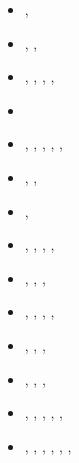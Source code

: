 \begin{small}
\begin{itemize}
\item[\twothousandsix]       \textcite{stfs06},  \textcite{momu06}
\item[\twothousandseven]     \textcite{moql07},  \textcite{stfs07}, 
                             \textcite{qums07}
\item[\twothousandeight]     \textcite{lemm08},  \textcite{ozrs08}, 
                             \textcite{gotc08},  \textcite{stmt08},
                             \textcite{scsf11}
\item[\twothousandnine]      \textcite{stfm09} 
\item[\twothousandten]       \textcite{casm10},  \textcite{mamb10}, 
                             \textcite{stsf10},  \textcite{stfc10},
                             \textcite{fasm10},  \textcite{cazf10}
\item[\twothousandeleven]    \textcite{memm11},  \textcite{cafz11},  \textcite{leha11}
\item[\twothousandtwelve]    \textcite{cafa12},  \textcite{faca12}
\item[\twothousandthirteen]  \textcite{bemm12},  \textcite{scmo13}, 
                             \textcite{faca13},  \textcite{care13}, 
                             \textcite{coml13}
\item[\twothousandfourteen]  \textcite{famc14},  \textcite{shjm14},  \textcite{grbo14},
                             \textcite{comi14}
\item[\twothousandfifteen]   \textcite{quxm15},  \textcite{bemm15}, 
                             \textcite{scsp15},  \textcite{shmj15}, 
                             \textcite{carr15}
\item[\twothousandsixteen]   \textcite{shmv16},  \textcite{onlw16}, 
                             \textcite{kicf16},  \textcite{sacf16}
\item[\twothousandseventeen] \textcite{bems17},  \textcite{kicf17}, 
                             \textcite{sche17},  \textcite{wakc17}
\item[\twothousandeighteen]  \textcite{memm18},  \textcite{yamz18}, 
                             \textcite{bemc18},  \textcite{mord18},
                             \textcite{wakc18},  \textcite{wakc18b}
\item[\twothousandnineteen]  \textcite{samo19},  \textcite{yamg19}, 
                             \textcite{canc19},  \textcite{cakc19},
                             \textcite{sams19b}, \textcite{bore19},

\end{itemize}
\end{small}
